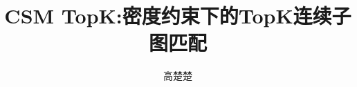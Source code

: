 \documentclass[doctor]{hnuthesis}
\title{CSM TopK:密度约束下的TopK连续子图匹配}
\author{高楚楚}
\begin{document}
\maketitle


\tableofcontents
\begingroup
    \renewcommand*{\addvspace}[1]{}
        \listoffigures
        \newpage

        \listoftables
        \newpage
\endgroup

\mainmatter





\appendix



\backmatter

\end{document}
